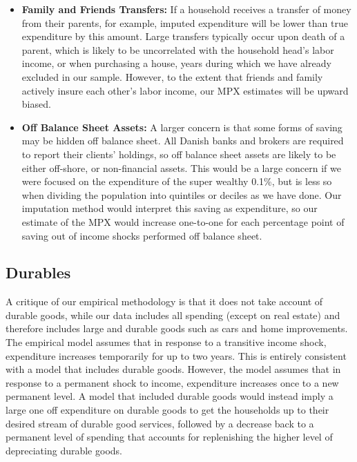 \documentclass[titlepage]{\econtex}\newcommand{\texname}{ConsumptionHeterogeneity}
\begin{document}
\begin{itemize}
	\item \textbf{Family and Friends Transfers:} If a household receives a transfer of money from their parents, for example, imputed expenditure will be lower than true expenditure by this amount. Large transfers typically occur upon death of a parent, which is likely to be uncorrelated with the household head's labor income, or when purchasing a house, years during which we have already excluded in our sample. However, to the extent that friends and family actively insure each other's labor income, our MPX estimates will be upward biased.
	\item \textbf{Off Balance Sheet Assets:} A larger concern is that some forms of saving may be hidden off balance sheet. All Danish banks and brokers are required to report their clients' holdings, so off balance sheet assets are likely to be either off-shore, or non-financial assets. This would be a large concern if we were focused on the expenditure of the super wealthy 0.1\%, but is less so when dividing the population into quintiles or deciles as we have done. Our imputation method would interpret this saving as expenditure, so our estimate of the MPX would increase one-to-one for each percentage point of saving out of income shocks performed off balance sheet.
\end{itemize}

\subsection{Durables} \label{durables}
A critique of our empirical methodology is that it does not take account of durable goods, while our data includes all spending (except on real estate) and therefore includes large and durable goods such as cars and home improvements. The empirical model assumes that in response to a transitive income shock, expenditure increases temporarily for up to two years. This is entirely consistent with a model that includes durable goods. However, the model assumes that in response to a permanent shock to income, expenditure increases once to a new permanent level. A model that included durable goods would instead imply a large one off expenditure on durable goods to get the households up to their desired stream of durable good services, followed by a decrease back to a permanent level of spending that accounts for replenishing the higher level of depreciating durable goods.
\end{document}
